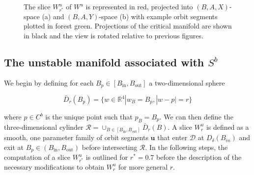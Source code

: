 \documentclass{ws-ijbc}
\begin{document}
\begin{figure}[ht]
\centering
{}
\caption{The slice $W^u_{r^*}$ of $W^u$ is represented in red, projected into $(B,A,X)$-space (a) and $(B,A,Y)$-space (b) with example orbit segments plotted in forest green.  Projections of the critical manifold are shown in black and the view is rotated relative to previous figures.}
\label{pieces}
\end{figure}

\subsection{The unstable manifold associated with $S^b$}

We begin by defining for each $B_p \in [B_{\mathrm{in}}, B_{\mathrm{out}}]$ a two-dimensional sphere

\begin{equation*}
\bar{D}_r(B_p)=\{w \in \mathbb{R}^4 | w_B = B_p, |w-p| = r\}
\end{equation*}

where $p \in C^b$ is the unique point such that $p_B = B_p$.  We can then define the three-dimensional cylinder $\mathscr{R} = \cup_{B \in [B_{\mathrm{in}}, B_{\mathrm{out}}]}\bar{D}_r(B)$.  A slice $W^u_r$ is defined as a smooth, one parameter family of orbit segments $\mathbf{u}$ that enter $\mathscr{D}$ at $D_\delta(B_{in})$ and exit at $B_p \in (B_{\mathrm{in}}, B_{\mathrm{out}})$ before intersecting $\mathscr{R}$.  In the following steps, the computation of a slice $W^u_{r^*}$ is outlined for $r^*=0.7$ before the description of the necessary modifications to obtain $W^u_r$ for more general $r$. 
\end{document}
